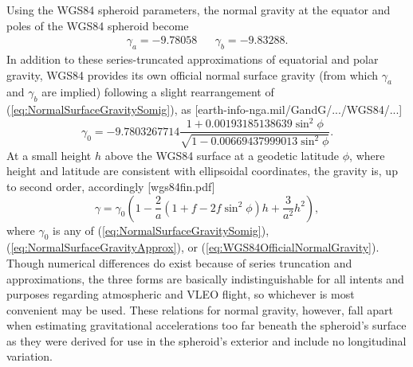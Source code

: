 \documentclass[11pt,dvipsnames]{thesis}
\begin{document}
Using the WGS84 spheroid parameters, the normal gravity at the equator and poles of the WGS84 spheroid become
\begin{align}
\gamma_a = -9.78058 && \gamma_b = -9.83288. \label{eq:EstimatedSurfaceGravAtEqPoles}
\end{align}
In addition to these series-truncated approximations of equatorial and polar gravity, WGS84 provides its own official normal surface gravity (from which $\gamma_a$ and $\gamma_b$ are implied) following a slight rearrangement of (\ref{eq:NormalSurfaceGravitySomig}), as [earth-info-nga.mil/GandG/.../WGS84/...]
\begin{equation}
\gamma_0 = -\num{9.7803267714} \frac{1 + \num{0.00193185138639} \sin^2\phi}{\sqrt{1 - \num{0.00669437999013}\sin^2\phi}}. \label{eq:WGS84OfficialNormalGravity}
\end{equation}
At a small height $h$ above the WGS84 surface at a geodetic latitude $\phi$, where height and latitude are consistent with ellipsoidal coordinates, the gravity is, up to second order, accordingly [wgs84fin.pdf]
\begin{equation}
\gamma = \gamma_0 \left(1 - \frac{2}{a}(1 + f - 2f \sin^2\phi)h + \frac{3}{a^2}h^2\right), \label{eq:SpheroidGravityAth}
\end{equation}
where $\gamma_0$ is any of (\ref{eq:NormalSurfaceGravitySomig}), (\ref{eq:NormalSurfaceGravityApprox}), or (\ref{eq:WGS84OfficialNormalGravity}). Though numerical differences do exist because of series truncation and approximations, the three forms are basically indistinguishable for all intents and purposes regarding atmospheric and VLEO flight, so whichever is most convenient may be used. These relations for normal gravity, however, fall apart when estimating gravitational accelerations too far beneath the spheroid's surface as they were derived for use in the spheroid's exterior and include no longitudinal variation.
\end{document}
